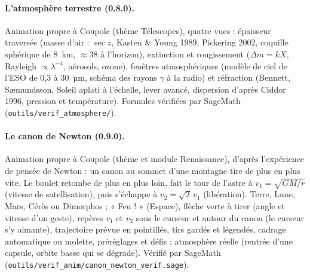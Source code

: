 \paragraph{L'atmosphère terrestre (0.8.0).} Animation propre à Coupole (thème Télescopes), quatre vues : épaisseur
traversée (masse d'air : $\sec z$, Kasten \& Young 1989, Pickering 2002, coquille sphérique de 8~km, $\approx 38$ à
l'horizon), extinction et rougissement ($\Delta m = kX$, Rayleigh $\propto \lambda^{-4}$, aérosols, ozone), fenêtres
atmosphériques (modèle de ciel de l'ESO de 0,3 à 30~µm, schéma des rayons $\gamma$ à la radio) et réfraction (Bennett,
Sæmundsson, Soleil aplati à l'échelle, lever avancé, dispersion d'après Ciddor 1996, pression et température).
Formules vérifiées par SageMath (\texttt{outils/verif\_atmosphere/}).

\paragraph{Le canon de Newton (0.9.0).} Animation propre à Coupole (thème et module Renaissance), d'après l'expérience
de pensée de Newton : un canon au sommet d'une montagne tire de plus en plus vite. Le boulet retombe de plus en plus
loin, fait le tour de l'astre à $v_1=\sqrt{GM/r}$ (vitesse de satellisation), puis s'échappe à $v_2=\sqrt{2}\,v_1$
(libération). Terre, Lune, Mars, Cérès ou Dimorphos ; « Feu ! » (Espace), flèche verte à tirer (angle et vitesse
d'un geste), repères $v_1$ et $v_2$ sous le curseur et autour du canon (le curseur s'y aimante), trajectoire prévue en
pointillés, tirs gardés et légendés, cadrage automatique ou molette, préréglages et défis ; atmosphère réelle (rentrée
d'une capsule, orbite basse qui se dégrade). Vérifié par SageMath (\texttt{outils/verif\_anim/canon\_newton\_verif.sage}).

